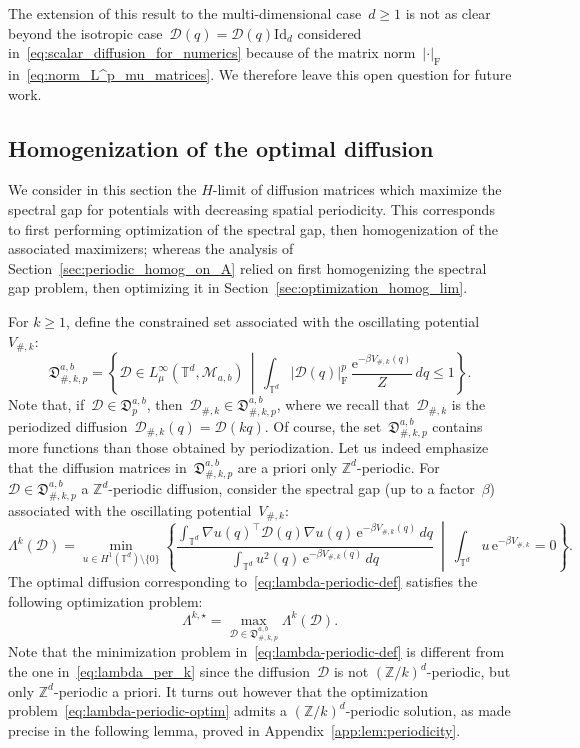 \documentclass{article}
\newcommand{\dps}{\displaystyle }
\newcommand{\rme}{\mathrm{e}}
\newcommand{\Id}{\mathrm{Id}}
\renewcommand{\leq}{\leqslant}
\renewcommand{\geq}{\geqslant}
\def\T{\mathbb{T}}
\def\Z{\mathbb{Z}}
\newcommand{\Diff}{\mathcal{D}}
\newcommand{\Diffset}{\mathfrak{D}}
\newcommand{\Df}{\mathscr{D}}
\newcommand{\F}{\mathrm{F}}
\newcommand{\normF}[1]{\left| #1 \right|_{\F}}
\renewcommand{\dim}{d}
\begin{document}
The extension of this result to the multi-dimensional case~$\dim \geq 1$ is not as clear beyond the isotropic case~$\Diff(q) = \Df(q) \Id_\dim$ considered in~\eqref{eq:scalar_diffusion_for_numerics} because of the matrix norm~$\normF{\cdot}$ in~\eqref{eq:norm_L^p_mu_matrices}. We therefore leave this open question for future work.

\subsection{Homogenization of the optimal diffusion}
\label{subsec:optim-homog}

We consider in this section the $H$-limit of diffusion matrices which maximize the spectral gap for potentials with decreasing spatial periodicity. This corresponds to first performing optimization of the spectral gap, then homogenization of the associated maximizers; whereas the analysis of Section~\ref{sec:periodic_homog_on_A} relied on first homogenizing the spectral gap problem, then optimizing it in Section~\ref{sec:optimization_homog_lim}. 

For $k\geq 1$, define the constrained set associated with the oscillating potential~$V_{\#,k}$:
\[
\Diffset_{\#,k,p}^{a,b} = \left\{\Diff\in L^{\infty}_{\mu}(\T^\dim,\mathcal{M}_{a,b}) \,\middle|\, \int_{\T^\dim}\normF{\Diff(q)}^p \, \frac{\rme^{-\beta V_{\#,k}(q)}}{Z} \, dq \leq 1 \right\}.
\]
Note that, if~$\Diff \in \Diffset_{p}^{a,b}$, then~$\Diff_{\#,k} \in \Diffset_{\#,k,p}^{a,b}$, where we recall that~$\Diff_{\#,k}$ is the periodized diffusion~$\Diff_{\#,k}(q) = \Diff(k q)$. Of course, the set~$\Diffset_{\#,k,p}^{a,b}$ contains more functions than those obtained by periodization. Let us indeed emphasize that the diffusion matrices in~$\Diffset_{\#,k,p}^{a,b}$ are a priori only $\mathbb{Z}^\dim$-periodic. For $\Diff\in\Diffset_{\#,k,p}^{a,b}$ a $\mathbb{Z}^\dim$-periodic diffusion, consider the spectral gap (up to a factor~$\beta$) associated with the oscillating potential~$V_{\#,k}$:
\begin{equation}
  \label{eq:lambda-periodic-def}
  \Lambda^k(\Diff) = \min_{u \in H^1(\T^\dim) \setminus\{0\}} \left\{ \frac{\dps \int_{\T^\dim} \nabla u(q)^\top \Diff(q)\nabla u(q)\, \rme^{-\beta V_{\#,k}(q)}\, dq}{\dps \int_{\T^\dim} u^2(q) \, \rme^{-\beta V_{\#,k}(q)} \, dq} \ \middle| \ \int_{\T^\dim} u \, \rme^{-\beta V_{\#,k}} = 0 \right\}.
\end{equation}
The optimal diffusion corresponding to~\eqref{eq:lambda-periodic-def} satisfies the following optimization problem:
\begin{equation}
  \label{eq:lambda-periodic-optim}
  \Lambda^{k,\star} = \max_{\Diff \in \Diffset_{\#,k,p}^{a,b}} \Lambda^k(\Diff).
\end{equation}
Note that the minimization problem in~\eqref{eq:lambda-periodic-def} is different from the one in~\eqref{eq:lambda_per_k} since the diffusion~$\Diff$ is not $(\mathbb{Z}/k)^\dim$-periodic, but only $\mathbb{Z}^\dim$-periodic a priori. It turns out however that the optimization problem~\eqref{eq:lambda-periodic-optim} admits a $(\Z/k)^\dim$-periodic solution, as made precise in the following lemma, proved in Appendix~\ref{app:lem:periodicity}.
\end{document}
